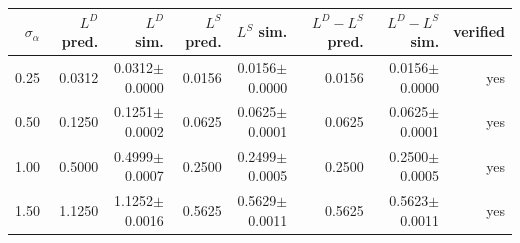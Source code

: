 \begin{tabular}{rrrrrrrr}
\toprule
$\sigma_\alpha$ & $L^D$ pred. & $L^D$ sim. & $L^S$ pred. & $L^S$ sim. & $L^D\!-\!L^S$ pred. & $L^D\!-\!L^S$ sim. & verified \\
\midrule
0.25 & 0.0312 & 0.0312$\pm$0.0000 & 0.0156 & 0.0156$\pm$0.0000 & 0.0156 & 0.0156$\pm$0.0000 & yes \\
0.50 & 0.1250 & 0.1251$\pm$0.0002 & 0.0625 & 0.0625$\pm$0.0001 & 0.0625 & 0.0625$\pm$0.0001 & yes \\
1.00 & 0.5000 & 0.4999$\pm$0.0007 & 0.2500 & 0.2499$\pm$0.0005 & 0.2500 & 0.2500$\pm$0.0005 & yes \\
1.50 & 1.1250 & 1.1252$\pm$0.0016 & 0.5625 & 0.5629$\pm$0.0011 & 0.5625 & 0.5623$\pm$0.0011 & yes \\
\bottomrule
\end{tabular}
